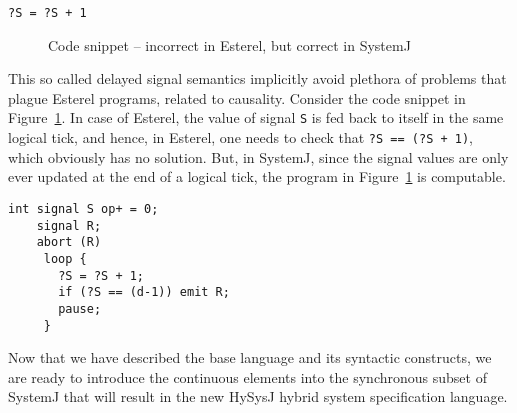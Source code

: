 \documentclass[10pt,journal,cspaper,compsoc]{IEEEtran}
\begin{document}
\newbox{\causals}
\begin{lrbox}{\causals}
  \begin{lstlisting}[style=sysj,morekeywords={signal,loop,abort,await,emit,present,trap,pause,exit,delay,suspend}]
    ?S = ?S + 1
  \end{lstlisting}
\end{lrbox}

\begin{figure}[t!]
  \centering
\usebox\causals
\caption{Code snippet -- incorrect in Esterel, but correct in
      SystemJ}
  \label{fig:11}
\end{figure}

This so called delayed signal semantics implicitly avoid plethora of
problems that plague Esterel programs, related to causality. 
Consider the code snippet in Figure~\ref{fig:11}. In case of Esterel,
the value of signal \texttt{S} is fed back to itself in the same logical
tick, and hence, in Esterel, one needs to check that \mbox{\texttt{?S ==
    (?S + 1)}}, which obviously has no solution. But, in SystemJ, since
the signal values are only ever updated at the end of a logical tick,
the program in Figure~\ref{fig:11} is computable.

\newbox{\flisting}
\begin{lrbox}{\flisting}
  \begin{lstlisting}[style=sysj,morekeywords={signal,loop,abort,await,emit,present,trap,pause,exit,delay,suspend}]
    int signal S op+ = 0;
    signal R;
    abort (R) 
     loop {
       ?S = ?S + 1;
       if (?S == (d-1)) emit R;
       pause;
     }
  \end{lstlisting}
\end{lrbox}



























Now that we have described the base language and its syntactic
constructs, we are ready to introduce the continuous elements into the
synchronous subset of SystemJ that will result in the new HySysJ hybrid
system specification language.
\end{document}
